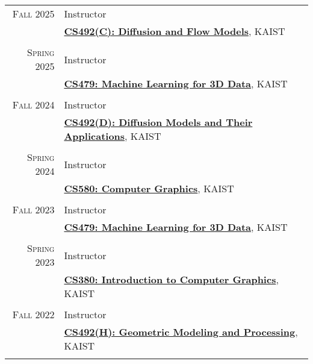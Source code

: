 \documentclass[letterpaper,10pt]{article} %
\begin{document}
{{\begin{tabular}{r|p{11cm}}
\textsc{Fall 2025} & Instructor\\
& \href{https://diffusion.kaist.ac.kr/}{\textbf{CS492(C): Diffusion and Flow Models}}, KAIST\\
& \\


\textsc{Spring 2025} & Instructor\\
& \href{https://mhsung.github.io/kaist-cs479-spring-2025/}{\textbf{CS479: Machine Learning for 3D Data}}, KAIST\\
& \\


\textsc{Fall 2024} & Instructor\\
& \href{https://mhsung.github.io/kaist-cs492d-fall-2024/}{\textbf{CS492(D): Diffusion Models and Their Applications}}, KAIST\\
& \\


\textsc{Spring 2024} & Instructor\\
& \href{https://mhsung.github.io/kaist-cs580-spring-2024/}{\textbf{CS580: Computer Graphics}}, KAIST\\
& \\


\textsc{Fall 2023} & Instructor\\
& \href{https://mhsung.github.io/kaist-cs479-fall-2023/}{\textbf{CS479: Machine Learning for 3D Data}}, KAIST\\
& \\


\textsc{Spring 2023} & Instructor\\
& \href{https://mhsung.github.io/kaist-cs380-spring-2023/}{\textbf{CS380: Introduction to Computer Graphics}}, KAIST\\
& \\


\textsc{Fall 2022} & Instructor\\
& \href{https://mhsung.github.io/kaist-cs492h-fall-2022/}{\textbf{CS492(H): Geometric Modeling and Processing}}, KAIST\\
& \\


\end{tabular}}}
\end{document}
